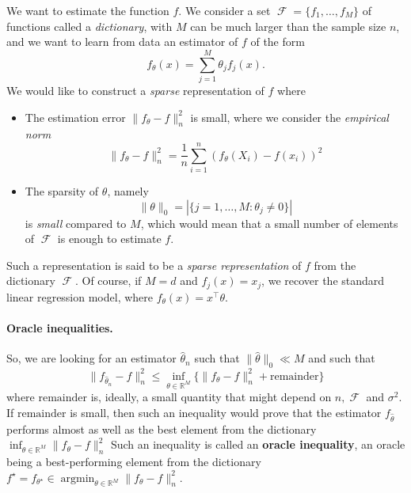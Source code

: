 \documentclass[
	fontsize=11pt, %
	twoside=false, %
	numbers=noenddot, %
]{kaobook}
\DeclareMathOperator{\cF}{{\mathcal F}}
\DeclareMathOperator*{\argmin}{argmin}
\newcommand{\R}{\mathbb R}
\newcommand{\wh}{\widehat}
\newcommand{\norm}[1]{\| #1 \|}
\begin{document}
We want to estimate the function $f$. 
We consider a set $\cF = \{ f_1, \ldots, f_M \}$ of functions called a \emph{dictionary}, with $M$ can be much larger than the sample size $n$, and we want to learn from data an estimator of $f$ of the form
\begin{equation*}
	f_\theta(x) = \sum_{j=1}^M \theta_j f_j(x).
\end{equation*}
We would like to construct a \emph{sparse} representation of $f$ where
\begin{itemize}
 	\item The estimation error $\norm{f_\theta - f}_n^2$ is small, where we consider the \emph{empirical norm}
 	\begin{equation*}
 		\norm{f_\theta - f}_n^2 = \frac 1n \sum_{i=1}^n (f_\theta(X_i) - f(x_i))^2
 	\end{equation*}
 	\item The sparsity of $\theta$, namely
 	\begin{equation*}
 		\norm{\theta}_0 = | \{ j=1, \ldots, M : \theta_j \neq 0\} |
 	\end{equation*}
 	is \emph{small} compared to $M$, which would mean that a small number of elements of $\cF$ is enough to estimate $f$.
 \end{itemize} 
Such a representation is said to be a \emph{sparse representation} of $f$ from the dictionary $\cF$.
Of course, if $M = d$ and $f_j(x) = x_j$, we recover the standard linear regression model, where $f_\theta(x) = x^\top \theta$.

\paragraph{Oracle inequalities.}

So, we are looking for an estimator $\wh \theta_n$ such that $\norm{\wh \theta}_0 \ll M$ and such that
\begin{equation}
	\label{eq:oracle-remainder}
	\norm{f_{\wh \theta_n} - f}_n^2 \leq \inf_{\theta \in \R^M} \Big\{ 
	\norm{f_\theta - f}_n^2 + \text{remainder} \Big\}
\end{equation}
where $\text{remainder}$ is, ideally, a small quantity that might depend on $n, \cF$ and $\sigma^2$.
If $\text{remainder}$ is small, then such an inequality would prove that the estimator $f_{\wh \theta}$ performs almost as well as the best element from the dictionary $\inf_{\theta \in \R^M} \norm{f_\theta - f}_n^2$
Such an inequality is called an \textbf{oracle inequality}, an oracle being a best-performing element from the dictionary $f^\star = f_{\theta^\star} \in \argmin_{\theta \in \R^M} \norm{f_\theta - f}_n^2$. 
\end{document}
